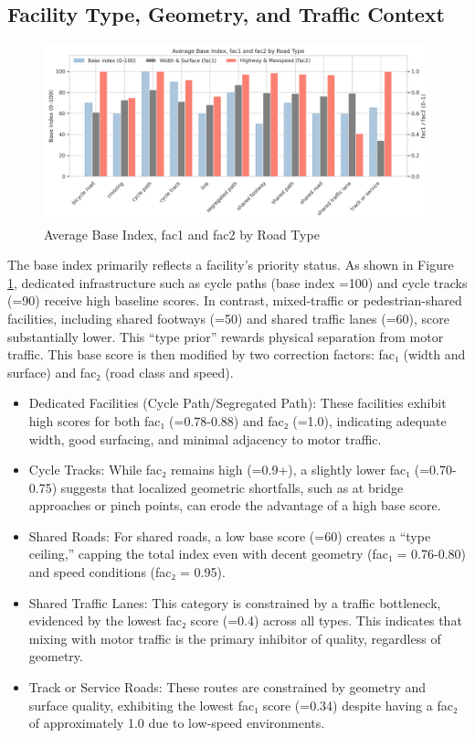 \documentclass[
  12pt,
  oneside]{book}
\begin{document}
\subsection{Facility Type, Geometry, and Traffic Context}\label{facility-type-geometry-and-traffic-context}

\begin{figure}

{\centering \includegraphics[width=0.95\linewidth]{general_images/fac1_2} 

}

\caption{Average Base Index, fac1 and fac2 by Road Type}\label{fig:fac12}
\end{figure}

The base index primarily reflects a facility's priority status. As shown in Figure \ref{fig:fac12}, dedicated infrastructure such as cycle paths (base index =100) and cycle tracks (=90) receive high baseline scores. In contrast, mixed-traffic or pedestrian-shared facilities, including shared footways (=50) and shared traffic lanes (=60), score substantially lower. This ``type prior'' rewards physical separation from motor traffic. This base score is then modified by two correction factors: fac₁ (width and surface) and fac₂ (road class and speed).

\begin{itemize}
\item
  Dedicated Facilities (Cycle Path/Segregated Path): These facilities exhibit high scores for both fac₁ (=0.78-0.88) and fac₂ (=1.0), indicating adequate width, good surfacing, and minimal adjacency to motor traffic.
\item
  Cycle Tracks: While fac₂ remains high (=0.9+), a slightly lower fac₁ (=0.70-0.75) suggests that localized geometric shortfalls, such as at bridge approaches or pinch points, can erode the advantage of a high base score.
\item
  Shared Roads: For shared roads, a low base score (=60) creates a ``type ceiling,'' capping the total index even with decent geometry (fac₁ = 0.76-0.80) and speed conditions (fac₂ = 0.95).
\item
  Shared Traffic Lanes: This category is constrained by a traffic bottleneck, evidenced by the lowest fac₂ score (=0.4) across all types. This indicates that mixing with motor traffic is the primary inhibitor of quality, regardless of geometry.
\item
  Track or Service Roads: These routes are constrained by geometry and surface quality, exhibiting the lowest fac₁ score (=0.34) despite having a fac₂ of approximately 1.0 due to low-speed environments.
\end{itemize}
\end{document}
